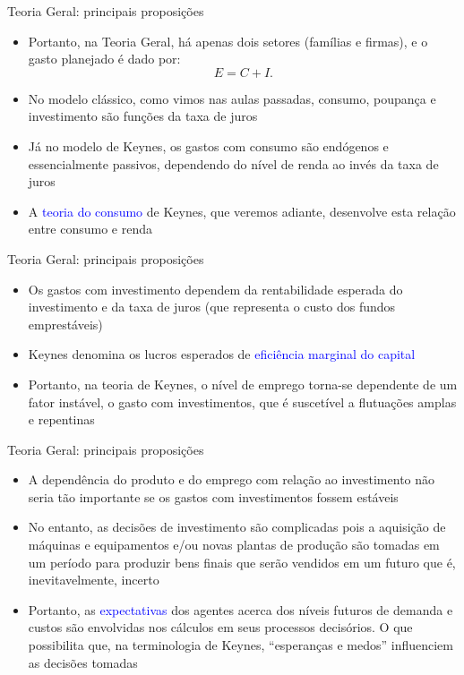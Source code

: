 \documentclass[10pt]{beamer}
\begin{document}
\begin{frame}{Teoria Geral: principais proposições}
    \begin{itemize}
        \item Portanto, na Teoria Geral, há apenas dois setores (famílias e firmas), e o gasto planejado é dado por:
        \begin{equation}
            E = C + I.
            \label{eq1}
        \end{equation}
        \bigskip
        \item No modelo clássico, como vimos nas aulas passadas, consumo, poupança e investimento são funções da taxa de juros
        \bigskip
        \item Já no modelo de Keynes, os gastos com consumo são endógenos e essencialmente passivos, dependendo do nível de renda ao invés da taxa de juros
        \bigskip
        \item A \textcolor{blue}{teoria do consumo} de Keynes, que veremos adiante, desenvolve esta relação entre consumo e renda
    \end{itemize}
\end{frame}

\begin{frame}{Teoria Geral: principais proposições}
    \begin{itemize}
        \item Os gastos com investimento dependem da rentabilidade esperada do investimento e da taxa de juros (que representa o custo dos fundos emprestáveis)
        \bigskip
        \item Keynes denomina os lucros esperados de \textcolor{blue}{eficiência marginal do capital}
        \bigskip
        \item Portanto, na teoria de Keynes, o nível de emprego torna-se dependente de um fator instável, o gasto com investimentos, que é suscetível a flutuações amplas e repentinas
    \end{itemize}
\end{frame}

\begin{frame}{Teoria Geral: principais proposições}
    \begin{itemize}
        \item A dependência do produto e do emprego com relação ao investimento não seria tão importante se os gastos com investimentos fossem estáveis
        \bigskip
        \item No entanto, as decisões de investimento são complicadas pois a aquisição de máquinas e equipamentos e/ou novas plantas de produção são tomadas em um período para produzir bens finais que serão vendidos em um futuro que é, inevitavelmente, incerto
        \bigskip
        \item Portanto, as \textcolor{blue}{expectativas} dos agentes acerca dos níveis futuros de demanda e custos são envolvidas nos cálculos em seus processos decisórios. O que possibilita que, na terminologia de Keynes, ``esperanças e medos'' influenciem as decisões tomadas
    \end{itemize}
\end{frame}
\end{document}
